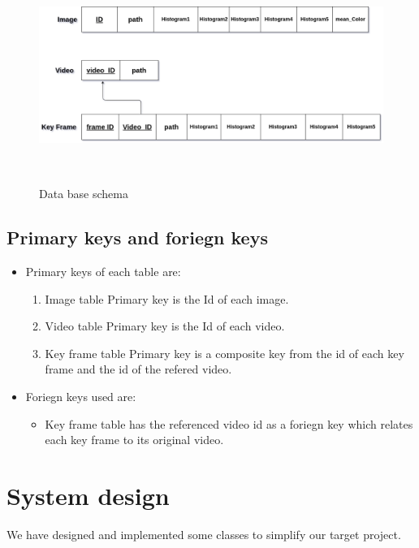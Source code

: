 \begin{figure}[H]
    \centering
    \includegraphics[width=120mm,height=70mm]{Images/database.png}
    \caption{Data base schema}
  \end{figure}
\subsection{Primary keys and foriegn keys}
\begin{itemize}
    \item Primary keys of each table are:
    \begin{enumerate}
        \item Image table Primary key is the Id of each image.      
        \item Video table Primary key is the Id of each video.
        \item Key frame table Primary key is a composite key from the id of each key frame and the id of the refered video.  
    \end{enumerate}        
    \item Foriegn keys used are:
    \begin{itemize}
        \item Key frame table has the referenced video id as a foriegn key which relates each key frame to its original video.      
    \end{itemize}
\end{itemize}

\section{System design}
We have designed and implemented some classes to simplify our target project.

